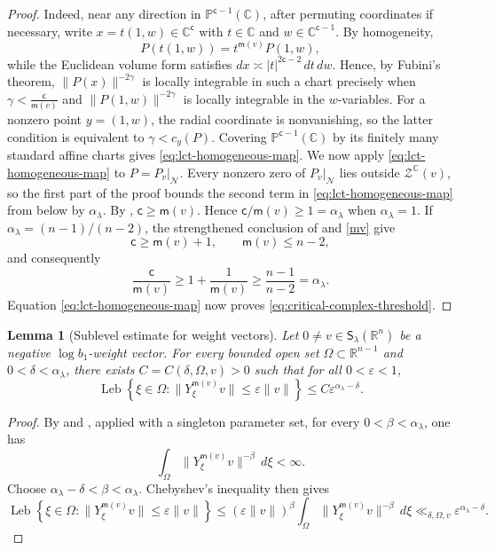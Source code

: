 \documentclass[reqno,11pt]{amsart}
\numberwithin{equation}{section}
\newtheorem{lemma}[theorem]{Lemma}
\theoremstyle{definition}
\theoremstyle{remark}
\begin{document}
\begin{proof}
Indeed, near any direction in $\mathbb P^{\mathsf{c}-1}(\mathbb C)$, after permuting
coordinates if necessary, write $x=t(1,w)\in \mathbb C^{\mathsf c}$ with $t\in\mathbb C$ and $w\in\mathbb C^{\mathsf{c}-1}$. By homogeneity,
$$
P(t(1,w))=t^{\mathsf m(v)}P(1,w),
$$
while the Euclidean volume form satisfies $dx\asymp |t|^{2\mathsf{c}-2}\,dt\,dw$. Hence, by Fubini's theorem, $\|P(x)\|^{-2\gamma}$ is locally integrable in such a chart precisely when
$\gamma<\frac{\mathsf{c}}{\mathsf m(v)}$
and $\|P(1,w)\|^{-2\gamma}$ is locally integrable in the $w$-variables.
For a nonzero point $y=(1,w)$, the radial coordinate is nonvanishing, so
the latter condition is equivalent to $\gamma<c_y(P)$. Covering
$\mathbb P^{\mathsf{c}-1}(\mathbb C)$ by its finitely many standard affine charts
gives \eqref{eq:lct-homogeneous-map}.
We now apply \eqref{eq:lct-homogeneous-map} to $P=P_v|_{\mathcal N}$. Every nonzero zero of $P_v|_{\mathcal N}$ lies outside
$\mathcal Z^{\mathbb C}(v)$, so the first part of the proof bounds the
second term in \eqref{eq:lct-homogeneous-map} from below by $\alpha_{\lambda}$.
By , $\mathsf{c}\ge \mathsf m(v)$. Hence
$\mathsf{c}/\mathsf m(v)\ge1=\alpha_{\lambda}$ when $\alpha_{\lambda}=1$. If
$\alpha_{\lambda}=(n-1)/(n-2)$, the strengthened conclusion of
 and \eqref{mv} give
$$
\mathsf{c}\ge \mathsf m(v)+1,
\qquad \mathsf m(v)\le n-2,
$$
and consequently
$$
\frac{\mathsf{c}}{\mathsf m(v)}\ge1+\frac{1}{\mathsf m(v)}
\ge\frac{n-1}{n-2}=\alpha_{\lambda}.
$$
Equation \eqref{eq:lct-homogeneous-map} now proves
\eqref{eq:critical-complex-threshold}.
\end{proof}

\begin{lemma}[Sublevel estimate for weight vectors]
\label{lem:critical-weight-sublevel}
Let $0\ne v\in{\mathsf S}_\lambda(\mathbb R^n)$ be a negative $\log b_1$-weight vector. For
every bounded open set $\Omega\subset\mathbb R^{n-1}$ and $0<\delta<\alpha_\lambda$,
there exists $C=C(\delta,\Omega,v)>0$ such that for all $0<\varepsilon<1$,
$$
\operatorname{Leb}
\left\{\xi\in\Omega:
\|Y_\xi^{\mathsf m(v)}v\|\le\varepsilon\|v\|\right\}
\le C\varepsilon^{\alpha_{\lambda}-\delta}.
$$

\end{lemma}

\begin{proof}
By  and
, applied with a singleton
parameter set, for every $0<\beta<\alpha_{\lambda}$, one has
\begin{equation}\label{eq:critical-negative-moment}
\int_\Omega
\|Y_\xi^{\mathsf m(v)}v\|^{-\beta}\,d\xi<\infty.
\end{equation}
Choose $\alpha_{\lambda}-\delta<\beta<\alpha_{\lambda}$. Chebyshev's inequality then gives
$$
\operatorname{Leb}
\left\{\xi\in\Omega:
\|Y_\xi^{\mathsf m(v)}v\|\le\varepsilon\|v\|\right\}
\le
(\varepsilon\|v\|)^\beta
\int_\Omega
\|Y_\xi^{\mathsf m(v)}v\|^{-\beta}\,d\xi
\ll_{\delta,\Omega,v}
\varepsilon^{\alpha_{\lambda}-\delta}.
$$
\end{proof}
\end{document}
